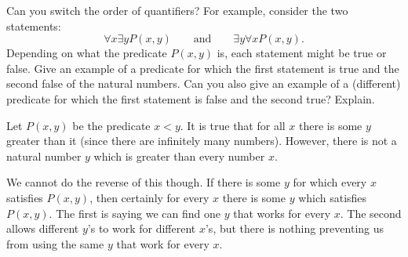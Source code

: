 \begin{questions}
	
	
	
	
\question Can you switch the order of quantifiers?  For example, consider the two statements:
\[\forall x \exists y P(x,y) \qquad \mathrm{ and } \qquad \exists y \forall x P(x,y).\]
Depending on what the predicate $P(x,y)$ is, each statement might be true or false.  Give an example of a predicate for which the first statement is true and the second false of the natural numbers.  Can you also give an example of a (different) predicate for which the first statement is false and the second true?  Explain.

	\begin{answer}
		Let $P(x,y)$ be the predicate $x < y$.  It is true that for all $x$ there is some $y$ greater than it (since there are infinitely many numbers).  However, there is not a natural number $y$ which is greater than every number $x$.
		
		We cannot do the reverse of this though.  If there is some $y$ for which every $x$ satisfies $P(x,y)$, then certainly for every $x$ there is some $y$ which satisfies $P(x,y)$.  The first is saying we can find one $y$ that works for every $x$.  The second allows different $y$'s to work for different $x$'s, but there is nothing preventing us from using the same $y$ that work for every $x$.
	\end{answer}





 


\end{questions}